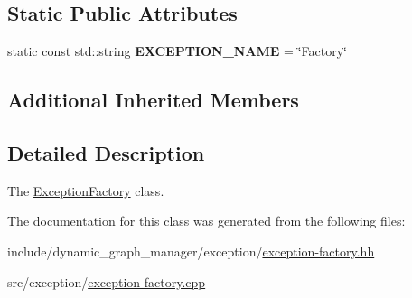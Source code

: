 \subsection*{Static Public Attributes}
\begin{DoxyCompactItemize}
\item 
static const std\+::string {\bfseries E\+X\+C\+E\+P\+T\+I\+O\+N\+\_\+\+N\+A\+ME} = \char`\"{}Factory\char`\"{}\hypertarget{classdynamic__graph_1_1ExceptionFactory_a7fe66d9197d860bd55f3a9676fa489b1}{}\label{classdynamic__graph_1_1ExceptionFactory_a7fe66d9197d860bd55f3a9676fa489b1}

\end{DoxyCompactItemize}
\subsection*{Additional Inherited Members}


\subsection{Detailed Description}
The \hyperlink{classdynamic__graph_1_1ExceptionFactory}{Exception\+Factory} class. 

The documentation for this class was generated from the following files\+:\begin{DoxyCompactItemize}
\item 
include/dynamic\+\_\+graph\+\_\+manager/exception/\hyperlink{exception-factory_8hh}{exception-\/factory.\+hh}\item 
src/exception/\hyperlink{exception-factory_8cpp}{exception-\/factory.\+cpp}\end{DoxyCompactItemize}
